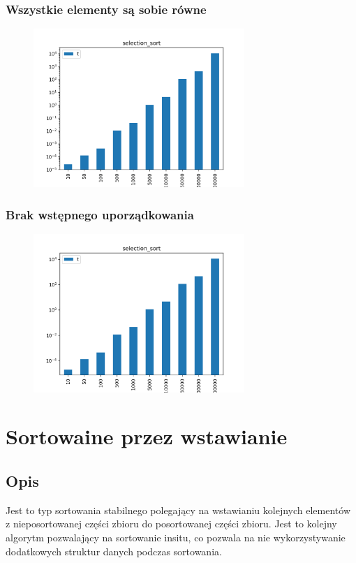 \documentclass[]{article}
\begin{document}
		\subsubsection{Wszystkie elementy są sobie równe}
			\begin{figure}[H]
				\centering
				\includegraphics[width=8cm]{selection_sort_c.png}	
			\end{figure}
		\subsubsection{Brak wstępnego uporządkowania}
			\begin{figure}[H]
				\centering
				\includegraphics[width=8cm]{selection_sort_r.png}	
			\end{figure}
\pagebreak
\section{Sortowaine przez wstawianie}
	\subsection{Opis}
		Jest to typ sortowania stabilnego polegający na wstawianiu kolejnych elementów z nieposortowanej części zbioru do posortowanej części zbioru. Jest to kolejny algorytm pozwalający na sortowanie insitu, co pozwala na nie wykorzystywanie dodatkowych struktur danych podczas sortowania.
\end{document}
